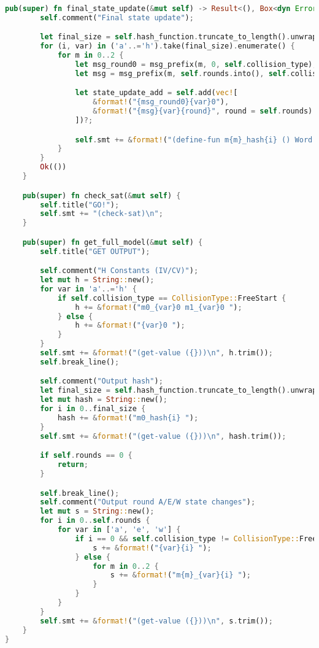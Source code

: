 \begin{lstlisting}[language=rust, caption={smt\_lib/encodings/generic\_shared.rs}]
	pub(super) fn final_state_update(&mut self) -> Result<(), Box<dyn Error>> {
		self.comment("Final state update");

		let final_size = self.hash_function.truncate_to_length().unwrap_or(8);
		for (i, var) in ('a'..='h').take(final_size).enumerate() {
			for m in 0..2 {
				let msg_round0 = msg_prefix(m, 0, self.collision_type);
				let msg = msg_prefix(m, self.rounds.into(), self.collision_type);

				let state_update_add = self.add(vec![
					&format!("{msg_round0}{var}0"),
					&format!("{msg}{var}{round}", round = self.rounds)
				])?;

				self.smt += &format!("(define-fun m{m}_hash{i} () Word {state_update_add})\n");
			}
		}
		Ok(())
	}

	pub(super) fn check_sat(&mut self) {
		self.title("GO!");
		self.smt += "(check-sat)\n";
	}

	pub(super) fn get_full_model(&mut self) {
		self.title("GET OUTPUT");

		self.comment("H Constants (IV/CV)");
		let mut h = String::new();
		for var in 'a'..='h' {
			if self.collision_type == CollisionType::FreeStart {
				h += &format!("m0_{var}0 m1_{var}0 ");
			} else {
				h += &format!("{var}0 ");
			}
		}
		self.smt += &format!("(get-value ({}))\n", h.trim());
		self.break_line();

		self.comment("Output hash");
		let final_size = self.hash_function.truncate_to_length().unwrap_or(8);
		let mut hash = String::new();
		for i in 0..final_size {
			hash += &format!("m0_hash{i} ");
		}
		self.smt += &format!("(get-value ({}))\n", hash.trim());

		if self.rounds == 0 {
			return;
		}

		self.break_line();
		self.comment("Output round A/E/W state changes");
		let mut s = String::new();
		for i in 0..self.rounds {
			for var in ['a', 'e', 'w'] {
				if i == 0 && self.collision_type != CollisionType::FreeStart && var != 'w' {
					s += &format!("{var}{i} ");
				} else {
					for m in 0..2 {
						s += &format!("m{m}_{var}{i} ");
					}
				}
			}
		}
		self.smt += &format!("(get-value ({}))\n", s.trim());
	}
}
\end{lstlisting}

